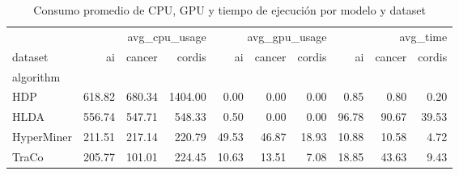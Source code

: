 \begin{table}
\caption{Consumo promedio de CPU, GPU y tiempo de ejecución por modelo y dataset}
\label{tab:cpu_gpu_usage}
\begin{tabular}{lrrrrrrrrr}
\toprule
 & \multicolumn{3}{r}{avg_cpu_usage} & \multicolumn{3}{r}{avg_gpu_usage} & \multicolumn{3}{r}{avg_time} \\
dataset & ai & cancer & cordis & ai & cancer & cordis & ai & cancer & cordis \\
algorithm &  &  &  &  &  &  &  &  &  \\
\midrule
HDP & 618.82 & 680.34 & 1404.00 & 0.00 & 0.00 & 0.00 & 0.85 & 0.80 & 0.20 \\
HLDA & 556.74 & 547.71 & 548.33 & 0.50 & 0.00 & 0.00 & 96.78 & 90.67 & 39.53 \\
HyperMiner & 211.51 & 217.14 & 220.79 & 49.53 & 46.87 & 18.93 & 10.88 & 10.58 & 4.72 \\
TraCo & 205.77 & 101.01 & 224.45 & 10.63 & 13.51 & 7.08 & 18.85 & 43.63 & 9.43 \\
\bottomrule
\end{tabular}
\end{table}
